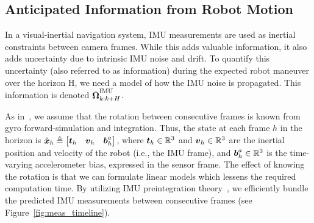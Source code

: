 \subsection{Anticipated Information from Robot Motion}\label{sub:info_motion}

In a visual-inertial navigation system, IMU measurements are used as inertial constraints between camera frames.
While this adds valuable information, it also adds uncertainty due to intrinsic IMU noise and drift.
To quantify this uncertainty (also referred to as information) during the expected robot maneuver over the horizon H, we need a model of how the IMU noise is propagated.
This information is denoted $\bar{\boldsymbol \Omega}_{k:k+H}^\text{IMU}$.

As in~\cite{Carlone2017}, we assume that the rotation between consecutive frames is known from gyro forward-simulation and integration.
Thus, the state at each frame $h$ in the horizon is $\hat{\boldsymbol x}_h\triangleq\begin{bmatrix}\boldsymbol t_h&\boldsymbol v_h&\boldsymbol b^a_h\end{bmatrix}$, where $\boldsymbol t_h\in\mathbb{R}^3$ and  $\boldsymbol v_h\in\mathbb{R}^3$ are the inertial position and velocity of the robot (i.e., the IMU frame), and $\boldsymbol b^a_h\in\mathbb{R}^3$ is the time-varying accelerometer bias, expressed in the sensor frame.
The effect of knowing the rotation is that we can formulate linear models which lessens the required computation time.
By utilizing IMU preintegration theory~\cite{Forster2017}, we efficiently bundle the predicted IMU measurements between consecutive frames (see Figure~\ref{fig:meas_timeline}).

